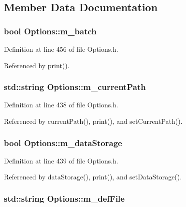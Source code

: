 \subsection{Member Data Documentation}
\hypertarget{classOptions_ae4461f1dd3357c0478098fc32e809405}{
\subsubsection[{m\_\-batch}]{\setlength{\rightskip}{0pt plus 5cm}bool {\bf Options::m\_\-batch}}}
\label{classOptions_ae4461f1dd3357c0478098fc32e809405}


Definition at line 456 of file Options.h.

Referenced by print().\hypertarget{classOptions_a9d82ad17fc1fd2315fc8a9e8d0d34f33}{
\subsubsection[{m\_\-currentPath}]{\setlength{\rightskip}{0pt plus 5cm}std::string {\bf Options::m\_\-currentPath}}}
\label{classOptions_a9d82ad17fc1fd2315fc8a9e8d0d34f33}


Definition at line 438 of file Options.h.

Referenced by currentPath(), print(), and setCurrentPath().\hypertarget{classOptions_a244898bb30c9f716bdc335b4d85d1dfb}{
\subsubsection[{m\_\-dataStorage}]{\setlength{\rightskip}{0pt plus 5cm}bool {\bf Options::m\_\-dataStorage}}}
\label{classOptions_a244898bb30c9f716bdc335b4d85d1dfb}


Definition at line 439 of file Options.h.

Referenced by dataStorage(), print(), and setDataStorage().\hypertarget{classOptions_a59ff5f2cab2490fb529367de13a2321a}{
\subsubsection[{m\_\-defFile}]{\setlength{\rightskip}{0pt plus 5cm}std::string {\bf Options::m\_\-defFile}}}
\label{classOptions_a59ff5f2cab2490fb529367de13a2321a}


